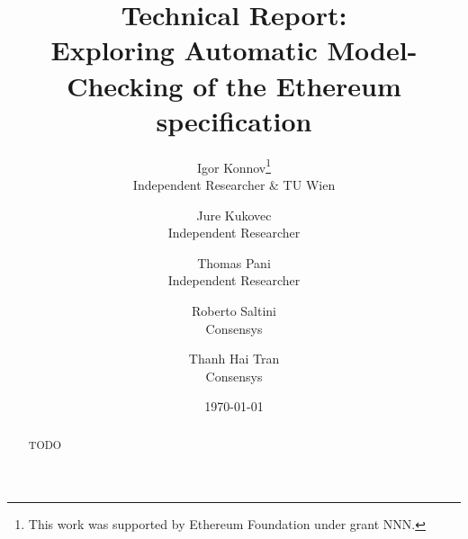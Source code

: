 \documentclass[12pt]{article}
\title{Technical Report:\\
       Exploring Automatic Model-Checking of the Ethereum specification}
\author{
    Igor Konnov\thanks{This work was supported by Ethereum Foundation
    under grant NNN.}\\ \small Independent Researcher \& TU Wien \\
    \and
    Jure Kukovec\footnotemark[1] \\ \small Independent Researcher \\
    \and
    Thomas Pani\footnotemark[1] \\ \small Independent Researcher\\
    \and
    Roberto Saltini \\ \small Consensys \\
    \and
    Thanh Hai Tran \\ \small Consensys
}
\date{\today}
\begin{document}
\maketitle

\begin{abstract}
    TODO
\end{abstract}



















\end{document}
